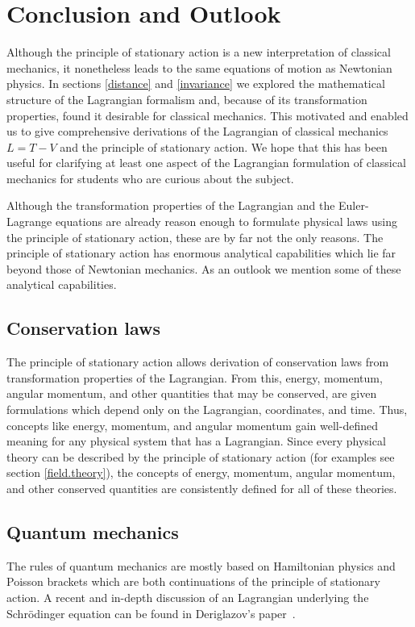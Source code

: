 \documentclass[prb,preprint]{revtex4-1}
\begin{document}
\section{Conclusion and Outlook}

Although the principle of stationary action is a new interpretation of classical mechanics, it nonetheless leads to the same equations of motion as Newtonian physics. In sections \ref{distance} and \ref{invariance} we explored the mathematical structure of the Lagrangian formalism and, because of its transformation properties, found it desirable for classical mechanics. This motivated and enabled us to give comprehensive derivations of the Lagrangian of classical mechanics $L=T-V$ and the principle of stationary action. We hope that this has been useful for clarifying at least one aspect of the Lagrangian formulation of classical mechanics for students who are curious about the subject.


Although the transformation properties of the Lagrangian and the Euler-Lagrange equations are already reason enough to formulate physical laws using the principle of stationary action, these are by far not the only reasons. The principle of stationary action has enormous analytical capabilities which lie far beyond those of Newtonian mechanics. As an outlook we mention some of these analytical capabilities.

\subsection{Conservation laws~\cite{KleinertConservation}}
The principle of stationary action allows derivation of conservation laws from transformation properties of the Lagrangian. From this, energy, momentum, angular momentum, and other quantities that may be conserved, are given formulations which depend only on the Lagrangian, coordinates, and time. Thus, concepts like energy, momentum, and angular momentum gain well-defined meaning for any physical system that has a Lagrangian. Since every physical theory can be described by the principle of stationary action (for examples see section \ref{field.theory}), the concepts of energy, momentum, angular momentum, and other conserved quantities are consistently defined for all of these theories.

\subsection{Quantum mechanics~\cite{Schwabl}}
The rules of quantum mechanics are mostly based on Hamiltonian physics and Poisson brackets which are both continuations of the principle of stationary action. A recent and in-depth discussion of an Lagrangian underlying the Schr{\"o}dinger equation can be found in Deriglazov's paper~\cite{Deriglazov}.
\end{document}
